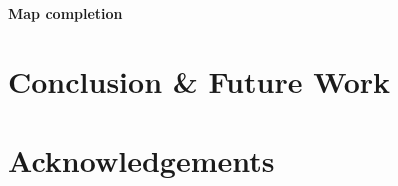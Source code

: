 \documentclass[10pt, titlepage]{article}
\theoremstyle{definition}
\begin{document}
\paragraph{Map completion} 

\newpage
\section{Conclusion \& Future Work}\label{section:conclusion}

\newpage
\section{Acknowledgements}\label{section:acknowledgement}

\newpage
\nocite{*}




\newpage
\appendix
\end{document}
